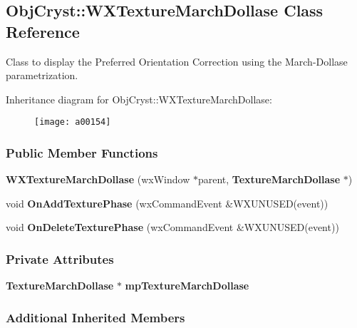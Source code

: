 \subsection{Obj\-Cryst\-:\-:W\-X\-Texture\-March\-Dollase Class Reference}
\label{a00154}


Class to display the Preferred Orientation Correction using the March-\/\-Dollase parametrization.  


Inheritance diagram for Obj\-Cryst\-:\-:W\-X\-Texture\-March\-Dollase\-:\begin{figure}[H]
\begin{center}
\leavevmode
\texttt{[image: a00154]}
\end{center}
\end{figure}
\subsubsection*{Public Member Functions}
\begin{DoxyCompactItemize}
\item 
{\bfseries W\-X\-Texture\-March\-Dollase} (wx\-Window $\ast$parent, {\bf Texture\-March\-Dollase} $\ast$)\label{a00154_ab8ab6eceeb0c83bf6dc4b6f775e02905}

\item 
void {\bfseries On\-Add\-Texture\-Phase} (wx\-Command\-Event \&W\-X\-U\-N\-U\-S\-E\-D(event))\label{a00154_aafd20a474b15713ea0c4fea247a254be}

\item 
void {\bfseries On\-Delete\-Texture\-Phase} (wx\-Command\-Event \&W\-X\-U\-N\-U\-S\-E\-D(event))\label{a00154_ae0f2b94788268422e5a2ca215f49387a}

\end{DoxyCompactItemize}
\subsubsection*{Private Attributes}
\begin{DoxyCompactItemize}
\item 
{\bf Texture\-March\-Dollase} $\ast$ {\bfseries mp\-Texture\-March\-Dollase}\label{a00154_aac7625565230e97c441006ff2f68dd2e}

\end{DoxyCompactItemize}
\subsubsection*{Additional Inherited Members}


